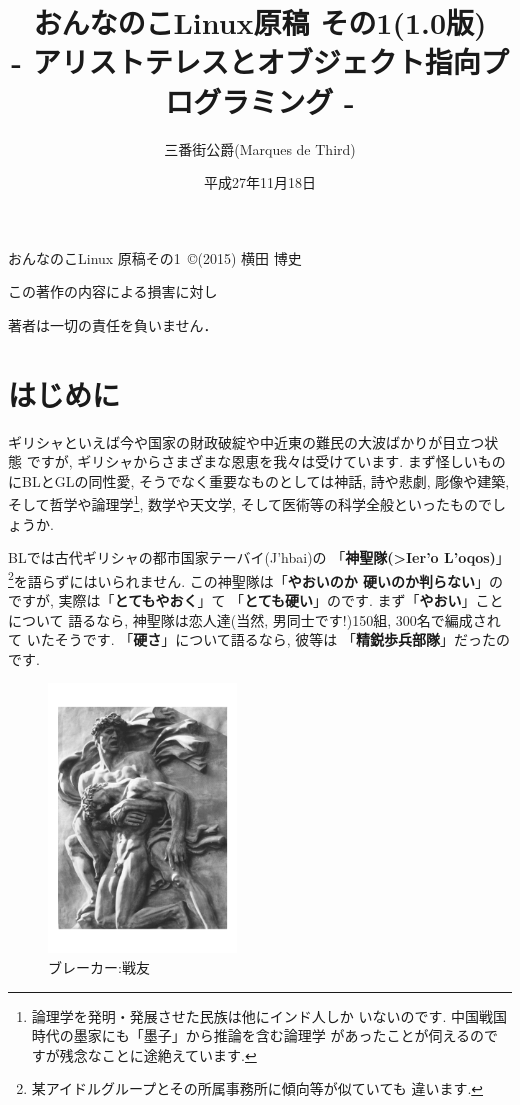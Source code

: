 \documentclass[b5j,8pt,twocolumn]{ltjsarticle}
\title{おんなのこLinux原稿 その1(1.0版)\\
- アリストテレスとオブジェクト指向プログラミング -}
\author{三番街公爵(Marques de Third)}
\date{
平成27年11月18日
 }
\newcommand{\textgreek}[1]{\begingroup\fontencoding{LGR}\selectfont#1\endgroup}
\begin{document}
\maketitle



おんなのこLinux 原稿その1~\copyright (2015) 横田 博史\par

この著作の内容による損害に対し

著者は一切の責任を負いません．
\clearpage
\newpage
\setcounter{page}{1}

\section{はじめに}

ギリシャといえば今や国家の財政破綻や中近東の難民の大波ばかりが目立つ状態
ですが, ギリシャからさまざまな恩恵を我々は受けています. まず怪しいもの
にBLとGLの同性愛, そうでなく重要なものとしては神話, 詩や悲劇, 彫像や建築,
 そして哲学や論理学\footnote{論理学を発明・発展させた民族は他にインド人しか
いないのです. 中国戦国時代の墨家にも「墨子」\cite{墨子}から推論を含む論理学
があったことが伺えるのですが残念なことに途絶えています.}, 数学や天文学,
 そして医術等の科学全般といったものでしょうか.
\newline

BLでは古代ギリシャの都市国家テーバイ(\textgreek{J'hbai})の
「\textbf{神聖隊(\textgreek{>Ier'o L'oqos})}」
\footnote{某アイドルグループとその所属事務所に傾向等が似ていても
違います.}を語らずにはいられません. この神聖隊は「\textbf{やおいのか
硬いのか判らない}」のですが, 実際は「\textbf{とてもやおく}」て
「\textbf{とても硬い}」のです. まず「\textbf{やおい}」ことについて
語るなら, 神聖隊は恋人達(当然, 男同士です!)150組, 300名で編成されて
いたそうです. 「\textbf{硬さ}」について語るなら, 彼等は
「\textbf{精鋭歩兵部隊}」だったのです.
\newline
 
 
\begin{figure}
\includegraphics[width=5cm]{arno_breker_kameradschaft.pdf}
\caption{ブレーカー:戦友}
\label{fig:breker2}
\end{figure}
\end{document}
